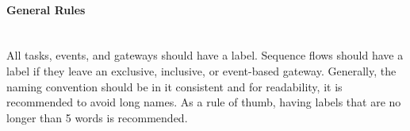 \paragraph{General Rules}~\\
All tasks, events, and gateways should have a label. Sequence flows should have a label if they leave an exclusive, inclusive, or event-based gateway. Generally, the naming convention should be in it consistent and for readability, it is recommended to avoid long names. As a rule of thumb, having labels that are no longer than 5 words is recommended\cite{fundamentals}. 